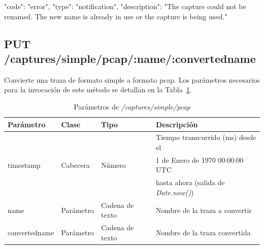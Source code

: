 \begin{itemize}
{\begin{minipage}{\textwidth}
\begin{code}[language=json]
{
  "code": "error",
  "type": "notification",
  "description": "The capture could not be renamed. The new name is already in use or the capture is being used."
}
\end{code}
\end{minipage}
}
\end{itemize}

%
%
\subsection{PUT /captures/simple/pcap/:name/:convertedname}
Convierte una \gls{traza} de formato \gls{simple} a formato \gls{pcap}.
Los parámetros necesarios para la invocación de este método se detallan en la Tabla~\ref{extra:api:capturessimplepcap:invocacion}.

\begin{table}[H]
\centering
\begin{tabular}{|l|l|l|l|}
\hline
\rowcolor[HTML]{F5F5F5}
\textbf{Parámetro}  & \textbf{Clase} & \textbf{Tipo}   & \textbf{Descripción}                        \\ \hline
                    &                &                 & Tiempo transcurrido (ms) desde el           \\
timestamp           & Cabecera       & Número          & 1 de Enero de 1970 00:00:00 UTC             \\
                    &                &                 & hasta ahora (salida de \textit{Date.now()}) \\ \hline
name                & Parámetro      & Cadena de texto & Nombre de la \gls{traza} a convertir        \\ \hline
convertedname       & Parámetro      & Cadena de texto & Nombre de la \gls{traza} convertida         \\ \hline
\end{tabular}
\caption{Parámetros de \textit{/captures/simple/pcap}}
\label{extra:api:capturessimplepcap:invocacion}
\end{table}


